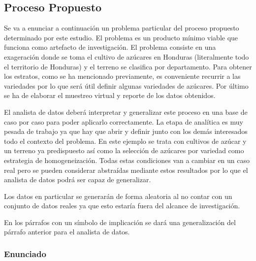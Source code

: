 %
%

\subsection{Proceso Propuesto}

Se va a enunciar a continuación un problema particular del proceso propuesto determinado por este estudio. El problema es un producto mínimo viable que funciona como artefacto de investigación. El problema consiste en una exageración donde se toma el cultivo de azúcares en Honduras (literalmente todo el territorio de Honduras) y el terreno se clasifica por departamento. Para obtener los estratos, como se ha mencionado previamente, es conveniente recurrir a las variedades por lo que será útil definir algunas variedades de azúcares. Por último se ha de elaborar el muestreo virtual y reporte de los datos obtenidos.

\bigbreak

El analista de datos deberá interpretar y generalizar este proceso en una base de caso por caso para poder aplicarlo correctamente. La etapa de analítica es muy pesada de trabajo ya que hay que abrir y definir junto con los demás interesados todo el contexto del problema. En este ejemplo se trata con cultivos de azúcar y un terreno ya predispuesto así como la selección de azúcares por variedad como estrategia de homogeneización. Todas estas condiciones van a cambiar en un caso real pero se pueden considerar abstraídas mediante estos resultados por lo que el analista de datos podrá ser capaz de generalizar.

\bigbreak

Los datos en particular se generarán de forma aleatoria al no contar con un conjunto de datos reales ya que esto estaría fuera del alcance de investigación.

\bigbreak

En los párrafos con un símbolo de implicación se dará una generalización del párrafo anterior para el analista de datos.

\subsubsection{Enunciado}

